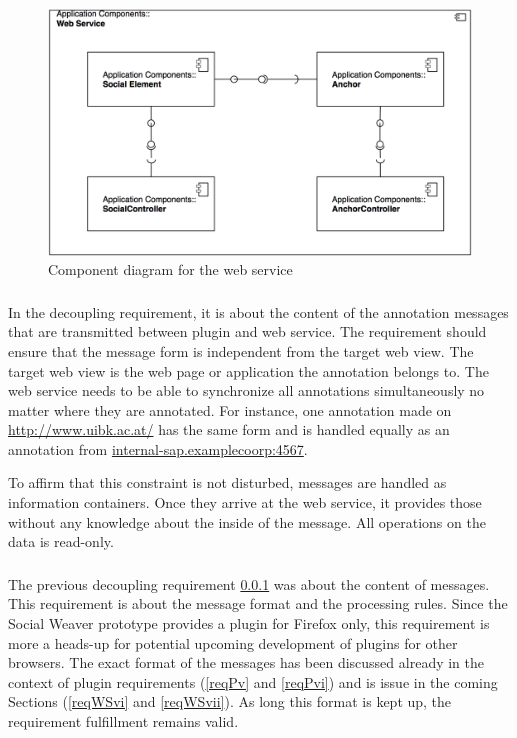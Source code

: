 \begin{figure}
	\includegraphics[width=13cm]{images/component-server-diagram.png}
	\caption{Component diagram for the web service}
	\label{component-server-diagram}
\end{figure}

\subsubsection[Decoupling Web Service and Target Web View]{\reqWSiv}\label{reqWSiv}
In the decoupling requirement, it is about the content of the annotation messages that are transmitted between plugin and web service. The requirement should ensure that the message form is independent from the target web view. The target web view is the web page or application the annotation belongs to. 
The web service needs to be able to synchronize all annotations simultaneously no matter where they are annotated. For instance, one annotation made on \url{http://www.uibk.ac.at/} has the same form and is handled equally as an annotation from \url{internal-sap.examplecoorp:4567}. 

To affirm that this constraint is not disturbed, messages are handled as information containers. Once they arrive at the web service, it provides those without any knowledge about the inside of the message. All operations on the data is read-only. 

\subsubsection[Decoupling Web Service and Plugin]{\reqWSv}\label{reqWSv}

The previous decoupling requirement \ref{reqWSiv} was about the content of messages. This requirement is about the message format and the processing rules. Since the Social Weaver prototype provides a plugin for Firefox only, this requirement is more a heads-up for potential upcoming development of plugins for other browsers. 
The exact format of the messages has been discussed already in the context of plugin requirements (\ref{reqPv} and \ref{reqPvi}) and is issue in the coming Sections (\ref{reqWSvi} and \ref{reqWSvii}). As long this format is kept up, the requirement fulfillment remains valid. 

